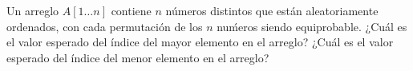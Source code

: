 \begin{statement}{9}
  Un arreglo $A[1 \dots n]$ contiene $n$ n\'umeros distintos que est\'an aleatoriamente ordenados,
  con cada permutaci\'on de los $n$ nu\'meros siendo equiprobable.
  ¿Cu\'al es el valor esperado del \'indice del mayor elemento en el arreglo?
  ¿Cu\'al es el valor esperado del \'indice del menor elemento en el arreglo?
\end{statement}